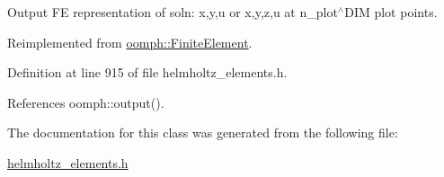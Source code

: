 Output FE representation of soln\+: x,y,u or x,y,z,u at n\+\_\+plot$^\wedge$\+D\+IM plot points. 



Reimplemented from \hyperlink{classoomph_1_1FiniteElement_afa9d9b2670f999b43e6679c9dd28c457}{oomph\+::\+Finite\+Element}.



Definition at line 915 of file helmholtz\+\_\+elements.\+h.



References oomph\+::output().



The documentation for this class was generated from the following file\+:\begin{DoxyCompactItemize}
\item 
\hyperlink{helmholtz__elements_8h}{helmholtz\+\_\+elements.\+h}\end{DoxyCompactItemize}
